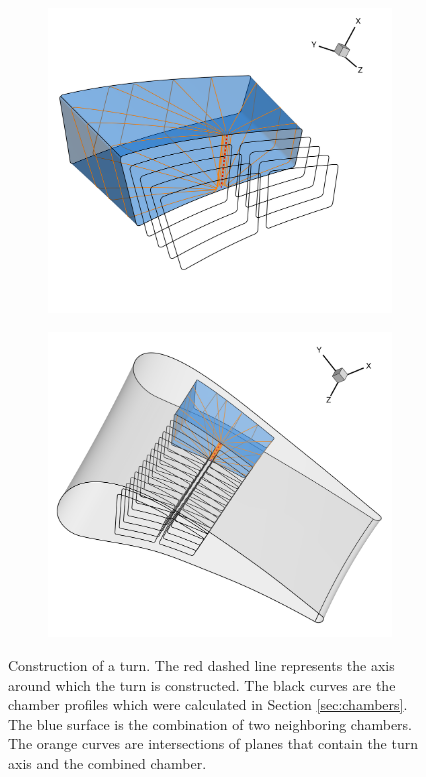 \documentclass[a4paper, 11pt]{report}
\theoremstyle{definition}
\begin{document}
	\begin{figure}[H]
		\centering
		\begin{subfigure}{.62\textwidth}
			\includegraphics[width=\textwidth]{../tec/channel/11.png}
		\end{subfigure}
		\begin{subfigure}{.37\textwidth}
			\includegraphics[width=\textwidth]{../tec/channel/12.png}
			\vspace{1.2cm}
		\end{subfigure}
		\caption{Construction of a turn. The red dashed line represents the axis around which the turn is constructed. The black curves are the chamber profiles which were calculated in Section \ref{sec:chambers}. The blue surface is the combination of two neighboring chambers. The orange curves are intersections of planes that contain the turn axis and the combined chamber.}
	\end{figure}
\end{document}
